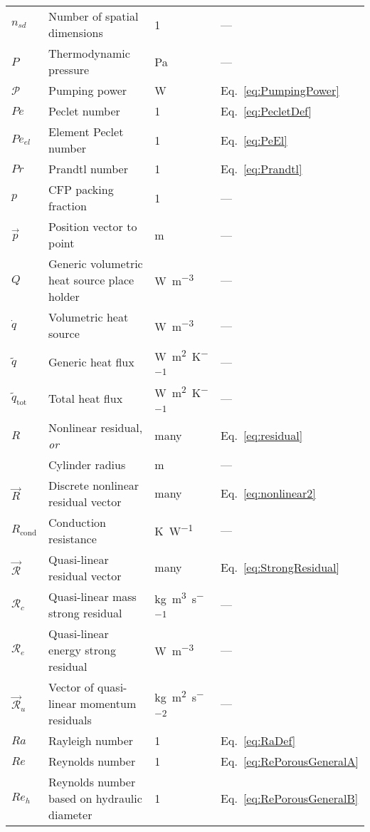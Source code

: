 \begin{longtable}{p{2cm}p{9cm}p{2cm}p{5cm}}
\(n_{sd}\) & Number of spatial dimensions & 1 & ---\\
\(P\) & Thermodynamic pressure & \si{\pascal} & ---\\
\(\mathcal{P}\) & Pumping power & \si{\watt} & Eq.\ \eqref{eq:PumpingPower}\\
\(Pe\) & Peclet number & 1 & Eq.\ \eqref{eq:PecletDef}\\
\(Pe_{el}\) & Element Peclet number & 1 & Eq.\ \eqref{eq:PeEl}\\
\(Pr\) & Prandtl number & 1 & Eq.\ \eqref{eq:Prandtl}\\
\(p\) & CFP packing fraction & 1 & ---\\
\(\vec{p}\) & Position vector to point & \si{\meter} & ---\\
\(Q\) & Generic volumetric heat source place holder & \si{\watt\per\cubic\meter} & ---\\
\(\dot{q}\) & Volumetric heat source & \si{\watt\per\cubic\meter} & ---\\
\(\tilde{q}\) & Generic heat flux & \si{\watt\per\square\meter\per\kelvin} & ---\\
\(\tilde{q}_\text{tot}\) & Total heat flux & \si{\watt\per\square\meter\per\kelvin} & ---\\
\(R\) & Nonlinear residual, \textit{or} & many & Eq.\ \eqref{eq:residual}\\
& Cylinder radius & \si{\meter} & ---\\
\(\vec{R}\) & Discrete nonlinear residual vector & many & Eq.\ \eqref{eq:nonlinear2}\\
\(R_{\text{cond}}\) & Conduction resistance & \si{\kelvin\per\watt} & ---\\
\(\vec{\mathscr{R}}\) & Quasi-linear residual vector & many & Eq.\ \eqref{eq:StrongResidual}\\
\(\mathscr{R}_c\) & Quasi-linear mass strong residual & \si{\kilo\gram\per\cubic\meter\per\second} & ---\\
\(\mathscr{R}_e\) & Quasi-linear energy strong residual & \si{\watt\per\cubic\meter} & ---\\
\(\vec{\mathscr{R}}_u\) & Vector of quasi-linear momentum residuals & \si{\kilo\gram\per\square\meter\per\square\second} & ---\\
\(Ra\) & Rayleigh number & 1 & Eq.\ \eqref{eq:RaDef}\\
\(Re\) & Reynolds number & 1 & Eq.\ \eqref{eq:RePorousGeneralA}\\
\(Re_h\) & Reynolds number based on hydraulic diameter & 1 & Eq.\ \eqref{eq:RePorousGeneralB}\\

\end{longtable}
